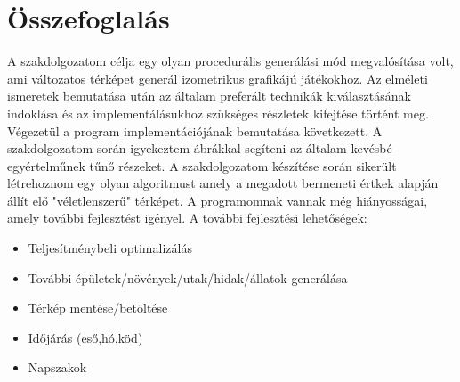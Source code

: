 \chapter{Összefoglalás}

A szakdolgozatom célja egy olyan procedurális generálási mód megvalósítása volt, ami változatos térképet generál izometrikus grafikájú játékokhoz. Az elméleti ismeretek bemutatása után az általam preferált technikák kiválasztásának indoklása és az implementálásukhoz szükséges részletek kifejtése történt meg. Végezetül a program implementációjának bemutatása következett. A szakdolgozatom során igyekeztem ábrákkal segíteni az általam kevésbé egyértelműnek tűnő részeket. 
\newline
\newline A szakdolgozatom készítése során sikerült létrehoznom egy olyan algoritmust amely a megadott bermeneti értkek alapján állít elő "véletlenszerű" térképet. A programomnak vannak még hiányosságai, amely további fejlesztést igényel.
\newline
\newline A további fejlesztési lehetőségek:
\begin{itemize}
\item Teljesítménybeli optimalizálás
\item További épületek/növények/utak/hidak/állatok generálása
\item Térkép mentése/betöltése
\item Időjárás (eső,hó,köd)
\item Napszakok
\end{itemize}
